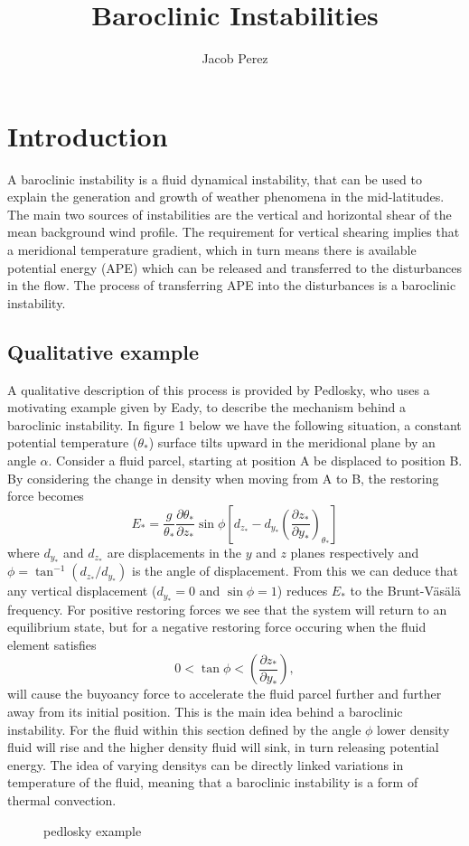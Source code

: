 \documentclass{article}
\title{Baroclinic Instabilities}
\author{Jacob Perez}
\begin{document}
 
\maketitle
\tableofcontents 
\section{Introduction} 

A baroclinic instability is a fluid dynamical instability, that can be used to explain the generation and growth of weather phenomena in the mid-latitudes. The main two sources of instabilities are the vertical and horizontal shear of the mean background wind profile. The requirement for vertical shearing implies that a meridional temperature gradient, which in turn means there is available potential energy (APE) which can be released and transferred to the disturbances in the flow. The process of transferring APE into the disturbances is a baroclinic instability.  
\subsection{Qualitative example} 
A qualitative description of this process is provided by Pedlosky, who uses a motivating example given by Eady, to describe the mechanism behind a baroclinic instability.  In figure 1 below we have the following situation, a constant potential temperature ($\theta_*$) surface tilts upward in the meridional plane by an angle $\alpha$. Consider a fluid parcel, starting at position A be displaced to position B. By considering the change in density when moving from A to B, the restoring force becomes  
\begin{equation}
  E_* = \frac{g}{\theta_*}\frac{\partial\theta_*}{\partial z_*}\sin\phi\left[d_{z_*}-d_{y_*}\left(\frac{\partial z_*}{\partial y_*}\right)_{\theta_*}\right]
\end{equation}
where $d_{y_*}$ and $d_{z_*}$ are displacements in the $y$ and $z$ planes respectively and $\phi=\tan^{-1}(d_{z_*}/d_{y_*})$ is the angle of displacement. From this we can deduce that any vertical displacement ($d_{y_*}=0$ and $\sin\phi = 1$) reduces $E_*$ to the Brunt-V\"as\"al\"a frequency. For positive restoring forces we see that the system will return to an equilibrium state, but for a negative restoring force occuring when the fluid element satisfies
\begin{equation}
  0 < \tan\phi < \left(\frac{\partial z_*}{\partial y_*}\right),
\end{equation}
will cause the buyoancy force to accelerate the fluid parcel further and further away from its initial position. This is the main idea behind a baroclinic instability. For the fluid within this section defined by the angle $\phi$ lower density fluid will rise and the higher density fluid will sink, in turn releasing potential energy. The idea of varying densitys can be directly linked variations in temperature of the fluid, meaning that a baroclinic instability is a form of thermal convection. 
\begin{figure}
  \centering
  
  \caption{pedlosky example}
\end{figure}
\end{document}
